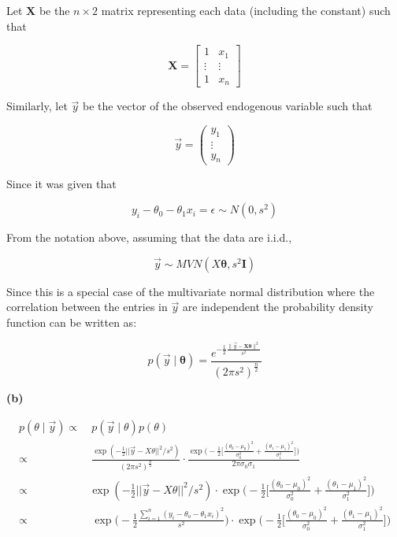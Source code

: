 \documentclass[11pt]{article}
\renewcommand\part[1]{\vspace{.10in}\textbf{(#1)}}
\begin{document}
Let $\mathbf{X}$ be the $n \times 2$ matrix representing each
data (including the constant) such that 

$$
\mathbf{X} = \left[
\begin{matrix}
1 & x_1 \\
\vdots & \vdots \\
1 & x_n 
\end{matrix}
\right]
$$

Similarly, let $\vec{y}$ be the vector of the observed endogenous
variable such that

$$
\vec{y} = \left(
\begin{matrix}
y_1 \\
\vdots\\
y_n 
\end{matrix}
\right)
$$

Since it was given that 

$$
y_i - \theta_0 - \theta_1 x_i = \epsilon \sim N(0, s^2)
$$

From the notation above, assuming that the data are i.i.d.,

$$
\vec{y} \sim MVN(X \mathbf{\theta}, s^2 \mathbf{I})
$$

Since this is a special case of the multivariate normal distribution
where the correlation between the entries in $\vec{y}$ are independent
the probability density function can be written as:

$$
p(\vec{y} \mid \mathbf{\theta}) =
\frac{e^{-\frac{1}{2} 
\frac{\lVert \vec{y} - \mathbf{X\mathbf{\theta}}\rVert^2}
{s^2}}}{(2 \pi s^2)^{\frac{n}{2}}}
$$

\part{b}

$$
\begin{aligned}
p(\theta \mid \vec{y}) \propto& \ p(\vec{y} \mid \theta)p(\theta)\\
\propto&\ \frac{\exp(-\frac{1}{2}||\vec{y}-X\theta||^2/s^2)}{(2\pi s^2)^\frac{n}{2}}
\cdot
\frac{\exp\Biggl(-\frac{1}{2}\Biggl[\frac{(\theta_0-\mu_0)^2}{\sigma_0^2} + \frac{(\theta_1-\mu_1)^2}{\sigma_1^2}\Biggr]\Biggr)}{2\pi \sigma_0 \sigma_1}\\
\propto& \exp(-\frac{1}{2}||\vec{y}-X\theta||^2/s^2)
\cdot
\exp\Biggl(-\frac{1}{2}\Biggl[\frac{(\theta_0-\mu_0)^2}{\sigma_0^2} + \frac{(\theta_1-\mu_1)^2}{\sigma_1^2}\Biggr]\Biggr)\\
\propto&\ \exp\Biggl(-\frac{1}{2}\frac{\sum_{i=1}^{n}(y_i-\theta_o-\theta_1x_i)^2}{s^2}\Biggr)
\cdot
\exp\Biggl(-\frac{1}{2}\Biggl[\frac{(\theta_0-\mu_0)^2}{\sigma_0^2} + \frac{(\theta_1-\mu_1)^2}{\sigma_1^2}\Biggr]\Biggr)\\
\end{aligned}
$$
\end{document}
